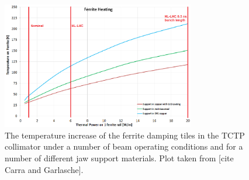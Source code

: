 \begin{figure}
\begin{center}
\includegraphics[width=0.75\textwidth]{LHC_Collimation_Upgrades/figures/temp_increase_tctp_col.png}
\end{center}
\label{fig:tctp-ferrite-temp-rise}
\caption{The temperature increase of the ferrite damping tiles in the TCTP collimator under a number of beam operating conditions and for a number of different jaw support materials. Plot taken from [cite Carra and Garlasche].}
\end{figure}